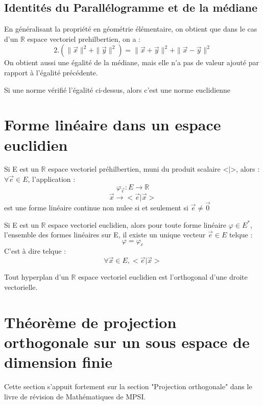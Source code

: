 \subsection{Identités du Parallélogramme et de la médiane}
\begin{enon}
En généralisant la propriété en géométrie élémentaire, on obtient que dans le cas d'un $\mathbb{R}$ espace vectoriel prehilbertien, on a :
$$2.(\parallel\overrightarrow{x}\parallel^2 + \parallel\overrightarrow{y}\parallel^2) = \parallel\overrightarrow{x}+ \overrightarrow{y}\parallel^2 + \parallel\overrightarrow{x} - \overrightarrow{y}\parallel^2$$
On obtient aussi une égalité de la médiane, mais elle n'a pas de valeur ajouté par rapport à l'égalité précédente.
\end{enon}
\begin{prop}
Si une norme vérifié l'égalité ci-dessus, alors c'est une norme euclidienne
\end{prop}
\section{Forme linéaire dans un espace euclidien}
\begin{prop}
Si E est un $\mathbb{R}$ espace vectoriel préhilbertien, muni du produit scalaire <|>, alors :\\
$\forall \overrightarrow{e} \in E$, l'application :
$$\varphi_{\overrightarrow{e}} : E \rightarrow \mathbb{R}$$
$$\overrightarrow{x} \rightarrow <\overrightarrow{e}|\overrightarrow{x}>$$
est une forme linéaire continue non nulee si et seulement si $\overrightarrow{e} \neq \overrightarrow{0}$
\end{prop}
\begin{prop}
Si E est un $\mathbb{R}$ espace vectoriel euclidien, alors pour toute forme linéaire $\varphi \in E^*$, l'ensemble des formes linéaires sur E, il existe un unique vecteur $\overrightarrow{e} \in E$ telque : 
$$\varphi = \varphi_e$$
C'est à dire telque : 
$$\forall \overrightarrow{x} \in E, <\overrightarrow{e}|\overrightarrow{x}>$$
\end{prop}
\begin{coro}
Tout hyperplan d'un $\mathbb{R}$ espace vectoriel euclidien est l'orthogonal d'une droite vectorielle.
\end{coro}
\section{Théorème de projection orthogonale sur un sous espace de dimension finie}
Cette section s'appuit fortement sur la section "Projection orthogonale" dans le livre de révision de Mathématiques de MPSI.
